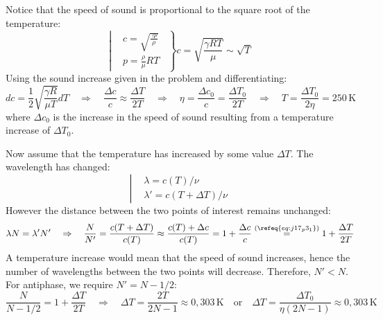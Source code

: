 \newpage
{}
Notice that the speed of sound is proportional to the square root of the temperature:
\begin{equation*}
	\left|
	\begin{aligned}
		& c = \sqrt{
			\frac{\gamma p}{\rho}
		}
		\\
		& p = \frac{\rho}{\mu} RT
	\end{aligned}
	\,\,\,
	\right\}
	c = \sqrt{
	\frac{\gamma RT}{\mu}
	}
	\sim
	\sqrt{T}
	\tag{$*$}
	\label{eq:j17_p3_mock_1}
\end{equation*}
Using the sound increase given in the problem and differentiating:
\begin{equation*}
	dc = \frac{1}{2} \sqrt{ \frac{\gamma R}{\mu T} } dT
	\quad\Rightarrow\quad
	\frac{\Delta c}{c} \approx
	\frac{\Delta T}{2T}
	\quad\Rightarrow\quad
	\eta = \frac{\Delta c_0}{c} = \frac{\Delta T_0}{2 T}
	\quad\Rightarrow\quad
	\boxed{T = \frac{\Delta T_0}{2 \eta} = 250\,\mathrm{K}}
	\tag{$1$}
	\label{eq:j17_p3_1}
\end{equation*}
where $\Delta c_0$ is the increase in the speed of sound resulting from a temperature increase of  $\Delta T_0$.

Now assume that the temperature has increased by some value $\Delta T$. The wavelength has changed:
\begin{equation*}
	\left|
	\begin{aligned}
		& \lambda = c(T) / \nu
		\\
		& \lambda' = c(T+\Delta T) / \nu
	\end{aligned}
	\right.
\end{equation*}
However the distance between the two points of interest remains unchanged:
\begin{equation*}
	\lambda N = \lambda' N'
	\quad\Rightarrow\quad
	\frac{N}{N'} = \frac{c(T+\Delta T)}{c(T)}
	\approx
	\frac{c(T) + \Delta c}{c(T)}
	=
	1 + \frac{\Delta c}{c}
	\stackrel{(\refeq{eq:j17_p3_1})}{=}
	1 + \frac{\Delta T}{2T}
\end{equation*}
A temperature increase would mean that the speed of sound increases, hence the number of wavelengths between the two points will decrease. Therefore, $N' < N$. For antiphase, we require $N' = N - 1/2$:
\begin{equation*}
	\frac{N}{N - 1/2} = 1 + \frac{\Delta T}{2T}
	\quad\Rightarrow\quad
	\boxed{\Delta T = \frac{2T}{2N - 1} \approx 0{,}303\,\mathrm{K}}
	\quad\text{or}\quad
	\boxed{\Delta T = \frac{\Delta T_0}{\eta (2N - 1)} \approx 0{,}303\,\mathrm{K}}
	\tag{$2$}
	\label{eq:j17_p3_2}
\end{equation*}

